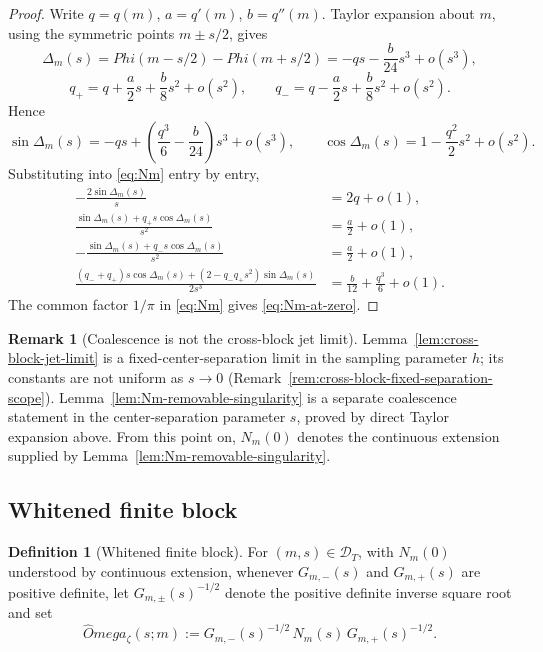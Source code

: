 \documentclass[11pt,a4paper]{amsart}
\def\Omega{Omega}%
\def\Phi{Phi}%
\numberwithin{equation}{section}
\theoremstyle{plain}
\theoremstyle{definition}
\newtheorem{definition}[theorem]{Definition}
\newtheorem{remark}[theorem]{Remark}
\newcommand{\z}{\zeta}
\newcommand{\Om}{\Omega}
\newcommand{\Ph}{\Phi}
\newcommand{\Del}{\Delta}
\begin{document}
\begin{proof}
Write \(q = q(m)\), \(a = q'(m)\), \(b = q''(m)\).  Taylor expansion
about \(m\), using the symmetric points \(m\pm s/2\), gives
\[
        \Del_m(s)
        = \Ph(m-s/2)-\Ph(m+s/2)
        = -qs - \frac{b}{24}s^3 + o(s^3),
\]
\[
        q_+ = q + \frac{a}{2}s + \frac{b}{8}s^2 + o(s^2),
        \qquad
        q_- = q - \frac{a}{2}s + \frac{b}{8}s^2 + o(s^2).
\]
Hence
\[
        \sin\Del_m(s)
        = -qs + \!\left(\frac{q^3}{6}-\frac{b}{24}\right)\!s^3
          + o(s^3),
        \qquad
        \cos\Del_m(s) = 1 - \frac{q^2}{2}s^2 + o(s^2).
\]
Substituting into \eqref{eq:Nm} entry by entry,
\begin{align*}
        -\frac{2\sin\Del_m(s)}{s}
        &= 2q + o(1),\\
        \frac{\sin\Del_m(s)+q_+ s\cos\Del_m(s)}{s^2}
        &= \frac{a}{2} + o(1),\\
        -\frac{\sin\Del_m(s)+q_- s\cos\Del_m(s)}{s^2}
        &= \frac{a}{2} + o(1),\\
        \frac{(q_-+q_+)s\cos\Del_m(s)+(2-q_- q_+ s^2)\sin\Del_m(s)}{2s^3}
        &= \frac{b}{12}+\frac{q^3}{6}+o(1).
\end{align*}
The common factor \(1/\pi\) in \eqref{eq:Nm} gives
\eqref{eq:Nm-at-zero}.
\end{proof}

\begin{remark}[Coalescence is not the cross-block jet limit]
\label{rem:Nm-coalescence-not-cross-limit}
Lemma~\ref{lem:cross-block-jet-limit} is a fixed-center-separation
limit in the sampling parameter \(h\); its constants are not uniform
as \(s\to 0\) (Remark~\ref{rem:cross-block-fixed-separation-scope}).
Lemma~\ref{lem:Nm-removable-singularity} is a separate coalescence
statement in the center-separation parameter \(s\), proved by direct
Taylor expansion above.  From this point on, \(N_m(0)\) denotes the
continuous extension supplied by Lemma~\ref{lem:Nm-removable-singularity}.
\end{remark}

\subsection{Whitened finite block}
\label{subsec:whitened-finite-block}

\begin{definition}[Whitened finite block]
\label{def:whitened-finite-block}
For \((m,s)\in\mathcal D_T\), with \(N_m(0)\) understood by continuous
extension, whenever \(G_{m,-}(s)\) and \(G_{m,+}(s)\) are positive
definite, let \(G_{m,\pm}(s)^{-1/2}\) denote the positive definite
inverse square root and set
\begin{equation}
\label{eq:omega-finite}
\widehat\Om_\z(s;m)
:= G_{m,-}(s)^{-1/2}\,N_m(s)\,G_{m,+}(s)^{-1/2}.
\end{equation}
\end{definition}
\end{document}
